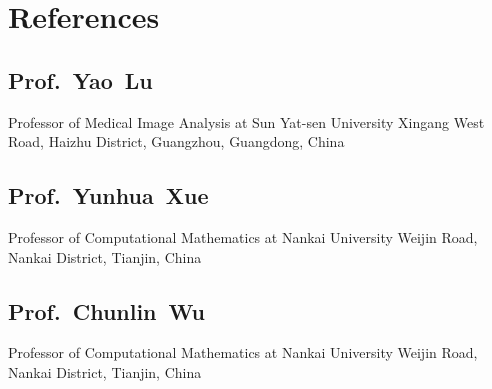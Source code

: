 \documentclass[11pt,a4paper, final]{moderncv}
\newcommand{\spacesubsection}{\vspace{0.2cm}}
\begin{document}
\section{\textbf{References}}
	\subsection{\textbf{Prof.~Yao~Lu}}
		\cvline{}
		{Professor of Medical Image Analysis at Sun Yat-sen University}
		{Xingang West Road, Haizhu District, Guangzhou, Guangdong, China}
	\spacesubsection
	\subsection{\textbf{Prof.~Yunhua~Xue}}
		\cvline{}
		{Professor of Computational Mathematics at Nankai University}
		{Weijin Road, Nankai District, Tianjin, China}
	\spacesubsection
	\subsection{\textbf{Prof.~Chunlin~Wu}}
		\cvline{}
		{Professor of Computational Mathematics at Nankai University}
		{Weijin Road, Nankai District, Tianjin, China}





\clearpage
\end{document}
